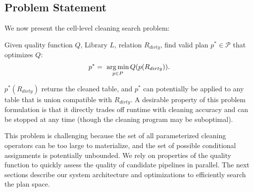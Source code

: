 



\subsection{Problem Statement}
We now present the cell-level cleaning search problem:
\begin{problem}%
Given quality function $Q$, Library $L$, relation $R_{dirty}$, find valid plan $p^* \in \mathcal{P}$ that optimizes $Q$:
\[
p^* = ~ \operatorname*{arg\,min}_{p \in P} Q( p(R_{dirty}) ).  
\]
\end{problem}
$p^*(R_{dirty})$ returns the cleaned table, and $p^*$ can potentially be applied to any table that is union compatible with $R_{dirty}$.  A desirable property of this problem formulation is that it directly trades off runtime with cleaning accuracy and can be stopped at any time (though the cleaning program may be suboptimal).

This problem is challenging because the set of all parameterized cleaning operators can be too large to materialize, and the set of possible conditional assignments is potentially unbounded.  We  rely on properties of the quality function to quickly assess the quality of candidate pipelines in parallel. The next sections describe our system architecture and optimizations to efficiently search the plan space.



